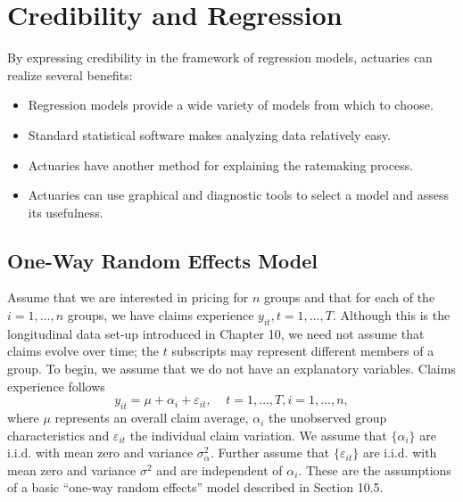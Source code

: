 \section{Credibility and Regression}\label{S18:CredRegression}

By expressing credibility in the framework of regression models,
actuaries can realize several benefits:

\begin{itemize}
\item Regression models provide a wide variety of models from
which to choose.
\item Standard statistical software makes analyzing data
relatively easy.
\item Actuaries have another method for explaining the
ratemaking process.
\item Actuaries can use graphical and diagnostic tools
to select a model and assess its usefulness.
\end{itemize}

\subsection{One-Way Random Effects Model}

Assume that we are interested in pricing for $n$ groups and that for
each of the $i=1,\ldots,n$ groups, we have claims experience
$y_{it}, t=1, \ldots, T$. Although this is the longitudinal data
set-up introduced in Chapter 10, we need not assume that claims
evolve over time; the $t$ subscripts may represent different members
of a group. To begin, we assume that we do not have an explanatory
variables. Claims experience follows
\begin{equation}\label{E18:OneWayRE}
y_{it} = \mu + \alpha_i + \varepsilon_{it}, ~~~~~ t=1, \ldots, T,
i=1,\ldots, n,
\end{equation}
where $\mu$ represents an overall claim average, $\alpha_i$ the
unobserved group characteristics and $\varepsilon_{it}$ the
individual claim variation. We assume that $\{\alpha_i\}$ are i.i.d.
with mean zero and variance $\sigma^2_{\alpha}$. Further assume that
$\{\varepsilon_{it}\}$ are i.i.d. with mean zero and variance
$\sigma^2$ and are independent of $\alpha_i$. These are the
assumptions of a basic ``one-way random effects'' model described in
Section 10.5.

